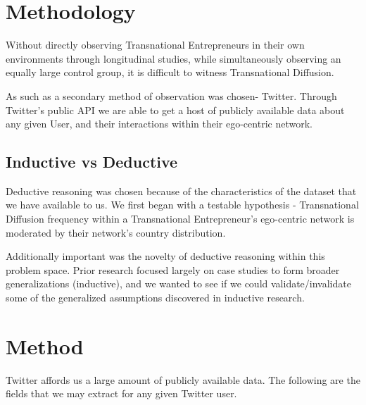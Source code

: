 \section{Methodology}
Without directly observing Transnational Entrepreneurs in their own environments through longitudinal studies, while simultaneously observing an equally large control group, it is difficult to witness Transnational Diffusion.
\par
As such as a secondary method of observation was chosen- Twitter. Through Twitter's public API we are able to get a host of publicly available data about any given User, and their interactions within their ego-centric network.

\subsection{Inductive vs Deductive}
Deductive reasoning was chosen because of the characteristics of the dataset that we have available to us. We first began with a testable hypothesis - Transnational Diffusion frequency within a Transnational Entrepreneur's ego-centric network is moderated by their network's country distribution.
\par
Additionally important was the novelty of deductive reasoning within this problem space. Prior research focused largely on case studies to form broader generalizations (inductive), and we wanted to see if we could validate/invalidate some of the generalized assumptions discovered in inductive research.

\section{Method}
Twitter affords us a large amount of publicly available data. The following are the fields that we may extract for any given Twitter user.

